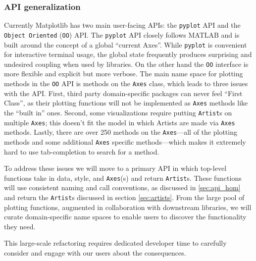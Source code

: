 \documentclass[11pt,letterpaper]{article}  %
\begin{document}
\subsubsection{API generalization}
\label{sec:api_gen}
Currently Matplotlib has two main user-facing APIs: the
\texttt{pyplot} API and the \texttt{Object Oriented} (\texttt{OO})
API.  The \texttt{pyplot} API closely follows MATLAB and is built
around the concept of a global ``current Axes''.
While
\texttt{pyplot} is convenient for interactive terminal usage, the global
state frequently produces surprising and undesired coupling when used
by libraries.
On the other hand the \texttt{OO} interface is more flexible and
explicit but more verbose.
The main name space for plotting methods in the \texttt{OO} API is
methods on the \texttt{Axes} class, which leads to three issues with
the API.
First, third party domain-specific packages can never feel ``First
Class'', as their plotting functions will not be implemented as
\texttt{Axes} methods like the ``built in'' ones.
Second, some visualizations require putting \texttt{Artist}s on
multiple \texttt{Axes}; this doesn't fit the model in which Artists
are made via \texttt{Axes} methods.
Lastly, there are over 250 methods on the \texttt{Axes}---all of the
plotting methods and some additional \texttt{Axes} specific
methods---which makes it extremely hard to use tab-completion to
search for a method.

To address these issues we will move to a primary API in which
top-level functions take in data, style, and \texttt{Axes}(s) and
return \texttt{Artist}s.  These functions will use consistent naming
and call conventions, as discussed in \ref{sec:api_hom} and return the
\texttt{Artist}s discussed in section \ref{sec:artists}.  From the
large pool of plotting functions, augmented in collaboration with
downstream libraries, we will curate domain-specific name spaces to
enable users to discover the functionality they need.

This large-scale refactoring requires dedicated developer time to
carefully consider and engage with our users about the consequences.

\end{document}
